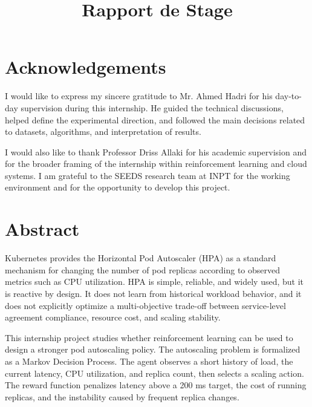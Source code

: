 \documentclass{rapportINPTCLOUD}
\title{Rapport de Stage}
\begin{document}

\fairemarges
\fairepagedegarde
\tabledematieres
\clearpage
\listoftables
\clearpage

\chapter*{Acknowledgements}

I would like to express my sincere gratitude to Mr. Ahmed Hadri for his day-to-day supervision during this internship. He guided the technical discussions, helped define the experimental direction, and followed the main decisions related to datasets, algorithms, and interpretation of results.

I would also like to thank Professor Driss Allaki for his academic supervision and for the broader framing of the internship within reinforcement learning and cloud systems. I am grateful to the SEEDS research team at INPT for the working environment and for the opportunity to develop this project.

\chapter*{Abstract}

Kubernetes provides the Horizontal Pod Autoscaler (HPA) as a standard mechanism for changing the number of pod replicas according to observed metrics such as CPU utilization. HPA is simple, reliable, and widely used, but it is reactive by design. It does not learn from historical workload behavior, and it does not explicitly optimize a multi-objective trade-off between service-level agreement compliance, resource cost, and scaling stability.

This internship project studies whether reinforcement learning can be used to design a stronger pod autoscaling policy. The autoscaling problem is formalized as a Markov Decision Process. The agent observes a short history of load, the current latency, CPU utilization, and replica count, then selects a scaling action. The reward function penalizes latency above a 200 ms target, the cost of running replicas, and the instability caused by frequent replica changes.
\end{document}

